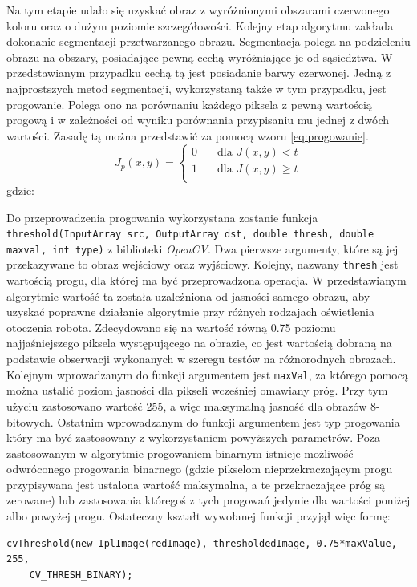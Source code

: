 Na tym etapie udało się uzyskać obraz z wyróżnionymi obszarami czerwonego koloru oraz o dużym poziomie szczegółowości. Kolejny etap algorytmu zakłada dokonanie segmentacji przetwarzanego obrazu. Segmentacja polega na podzieleniu obrazu na obszary, posiadające pewną cechą wyróżniające je od sąsiedztwa\cite{Malina}. W przedstawianym przypadku cechą tą jest posiadanie barwy czerwonej. Jedną z najprostszych metod segmentacji, wykorzystaną także w tym przypadku, jest progowanie. Polega ono na porównaniu każdego piksela z pewną wartością progową i w zależności od wyniku porównania przypisaniu mu jednej z dwóch wartości. Zasadę tą można przedstawić za pomocą wzoru \ref{eq:progowanie}.
\begin{equation}
J_p(x, y) =
  \begin{cases}
    0	& \quad \text{dla } J(x, y) < t\\
    1	& \quad \text{dla } J(x, y) \geq t\\
  \end{cases}
\label{eq:progowanie}
\end{equation}
gdzie:
\begin{equationDescriptor}
\end{equationDescriptor}
Do przeprowadzenia progowania wykorzystana zostanie funkcja \texttt{threshold(InputArray src, OutputArray dst, double thresh, double maxval, int type)} z biblioteki \textit{OpenCV}. Dwa pierwsze argumenty, które są jej przekazywane to obraz wejściowy oraz wyjściowy. Kolejny, nazwany \texttt{thresh} jest wartością progu, dla której ma być przeprowadzona operacja. W przedstawianym algorytmie wartość ta została uzależniona od jasności samego obrazu, aby uzyskać poprawne działanie algorytmie przy różnych rodzajach oświetlenia otoczenia robota. Zdecydowano się na wartość równą 0.75 poziomu najjaśniejszego piksela występującego na obrazie, co jest wartością dobraną na podstawie obserwacji wykonanych w szeregu testów na różnorodnych obrazach. Kolejnym wprowadzanym do funkcji argumentem jest \texttt{maxVal}, za którego pomocą można ustalić poziom jasności dla pikseli wcześniej omawiany próg. Przy tym użyciu zastosowano wartość 255, a więc maksymalną jasność dla obrazów 8-bitowych. Ostatnim wprowadzanym do funkcji argumentem jest typ progowania który ma być zastosowany z wykorzystaniem powyższych parametrów. Poza zastosowanym w algorytmie progowaniem binarnym istnieje możliwość odwróconego progowania binarnego (gdzie pikselom nieprzekraczającym progu przypisywana jest ustalona wartość maksymalna, a te przekraczające próg są zerowane) lub zastosowania któregoś z tych progowań jedynie dla wartości poniżej albo powyżej progu. Ostateczny kształt wywołanej funkcji przyjął więc formę:
\begin{lstlisting}[caption=Funkcja realizująca progowanie]
cvThreshold(new IplImage(redImage), thresholdedImage, 0.75*maxValue, 255,
	CV_THRESH_BINARY);
\end{lstlisting}

